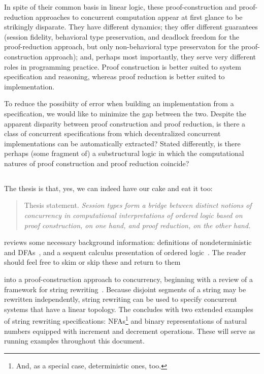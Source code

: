In spite of their common basis in linear logic, these proof-construction and proof-reduction approaches to concurrent computation appear at first glance to be strikingly disparate.
They have different dynamics; they offer different guarantees (session fidelity, behavioral type preservation, and deadlock freedom for the proof-reduction approach, but only non-behavioral type preservaton for the proof-construction approach); and, perhaps most importantly, they serve very different roles in programming practice.
Proof construction is better suited to system specification and reasoning, whereas proof reduction is better suited to implementation.

To reduce the possibiity of error when building an implementation from a specification, we would like to minimize the gap between the two.
Despite the apparent disparity between proof construction and proof reduction, is there a class of concurrent specifications from which decentralized concurrent implementations can be automatically extracted?
Stated differently, is there perhaps (some fragment of) a substructural logic in which the computational natures of proof construction and proof reduction coincide?

\subsection{}

The thesis is that, yes, we can indeed have our cake and eat it too:
\begin{quotation}
\normalsize\noindent
Thesis statement.
\itshape Session types form a bridge between distinct notions of concurrency in computational interpretations of ordered logic based on proof construction, on one hand, and proof reduction, on the other hand.
\end{quotation}

 reviews some necessary background information: definitions of nondeterministic and \aclp*{DFA}~, and a sequent calculus presentation of ordered logic~.
The reader should feel free to skim or skip these  and return to them 

 into a proof-construction approach to concurrency, beginning with a review of a framework for string rewriting~.
Because disjoint segments of a string may be rewritten independently, string rewriting can be used to specify concurrent systems that have a linear topology.
The  concludes with two extended examples of string rewriting specifications:
\aclp*{NFA}\footnote{And, as a special case, deterministic ones, too.}
and binary representations of natural numbers equipped with increment and decrement operations.
These will serve as running examples throughout this document.

